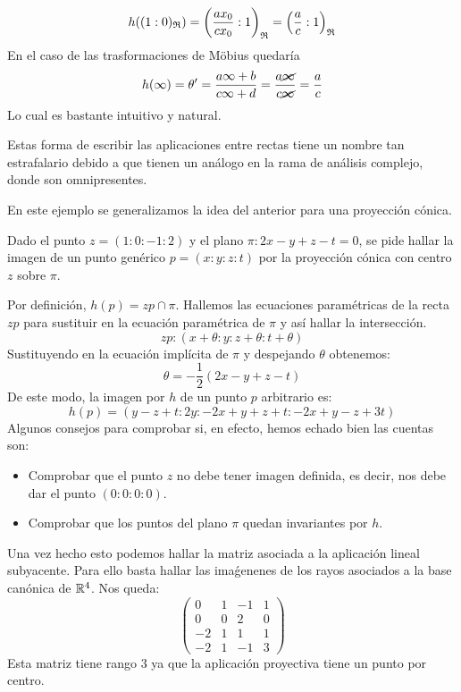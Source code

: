 \[h((1:0)_{\mathfrak{R}})=\left(\frac{ax_0}{cx_0}:1\right)_{\mathfrak{R}}=\left(\frac{a}{c}:1\right)_{\mathfrak{R}}\]
En el caso de las trasformaciones de Möbius quedaría
\[h(\infty)=\theta'=\frac{a\infty+b}{c\infty+d}=\frac{a\cancel{\infty}}{c\cancel{\infty}}=\frac{a}{c}\]
Lo cual es bastante intuitivo y natural.

Estas forma de escribir las aplicaciones entre rectas tiene un nombre tan estrafalario debido a que tienen un análogo en la rama de análisis complejo, donde son omnipresentes.

En este ejemplo se generalizamos la idea del anterior para una proyección cónica.
\begin{exa}
	Dado el punto $z=(1:0:-1:2)$ y el plano $\pi:2x-y+z-t=0$, se pide hallar la imagen de un punto genérico $p=(x:y:z:t)$ por la proyección cónica con centro $z$ sobre $\pi$.
	
	Por definición, $h(p)=zp\cap\pi$. Hallemos las ecuaciones paramétricas de la recta $zp$ para sustituir en la ecuación paramétrica de $\pi$ y así hallar la intersección.
	\[zp:(x+\theta:y:z+\theta:t+\theta)\]
	Sustituyendo en la ecuación implícita de $\pi$ y despejando $\theta$ obtenemos:
	\[\theta=-\frac{1}{2}(2x-y+z-t)\]
	De este modo, la imagen por $h$ de un punto $p$ arbitrario es:
	\[h(p)=(y-z+t:2y:-2x+y+z+t:-2x+y-z+3t)\]
	Algunos consejos para comprobar si, en efecto, hemos echado bien las cuentas son:
	\begin{itemize}
		\item Comprobar que el punto $z$ no debe tener imagen definida, es decir, nos debe dar el punto $(0:0:0:0)$.
		\item Comprobar que los puntos del plano $\pi$ quedan invariantes por $h$.
	\end{itemize}
	Una vez hecho esto podemos hallar la matriz asociada a la aplicación lineal subyacente. Para ello basta hallar las imaǵenenes de los rayos asociados a la base canónica de $\mathbb{R}^4$. Nos queda:
	\[\begin{pmatrix}
	0 & 1 & -1 & 1\\
	0 & 0 & 2 & 0\\
	-2 & 1 & 1 & 1\\
	-2 & 1 & -1 & 3
	\end{pmatrix}\]
	Esta matriz tiene rango $3$ ya que la aplicación proyectiva tiene un punto por centro.
	

\end{exa}
